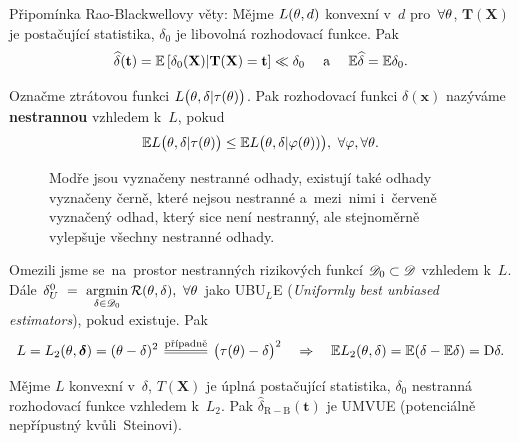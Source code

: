 \begin{remark}
	Připomínka Rao-Blackwellovy věty: Mějme $L(\theta,d)$ konvexní v~$d$ pro~$\forall\theta$, $\textbf{T}(\textbf{X})$ je postačující statistika, $\delta_0$ je libovolná rozhodovací funkce. Pak $$\widehat{\delta}(\textbf{t})=\mathbb{E}\left[ \delta_0(\textbf{X})|\textbf{T}(\textbf{X})=\textbf{t} \right]\ll \delta_0\quad\text{ a~}\quad\mathbb{E}\widehat{\delta}=\mathbb{E} \delta_0.$$
\end{remark}
\begin{define}
	Označme ztrátovou funkci $L\big(\theta,\delta|\tau(\theta)\big)$. Pak rozhodovací funkci $\delta(\textbf{x})$ nazýváme \textbf{nestrannou} vzhledem k~$L$, pokud $$ \mathbb{E} L\big(\theta,\delta|\tau(\theta)\big)\leq \mathbb{E} L\big(\theta,\delta|\varphi(\theta))\big),~\forall\varphi,\forall\theta.$$
\end{define}	\begin{figure}[h]
	\centering
	\caption{Modře jsou vyznačeny nestranné odhady, existují také odhady vyznačeny černě, které nejsou nestranné a~mezi~nimi i~červeně vyznačený odhad, který sice není nestranný, ale stejnoměrně vylepšuje všechny nestranné odhady.}
	\label{fig:3}
\end{figure}
Omezili jsme se~na~prostor nestranných rizikových funkcí $\mathscr{D}_0\subset \mathscr{D} $ vzhledem k~$L$. Dále
$ \delta_U^0~=~\mathop{\mathrm{argmin}}\limits_{\delta\in\mathscr{D} _0}\mathcal{R}(\theta,\delta),~\forall\theta$ jako UBU$_L$E (\textit{Uniformly best unbiased estimators}), pokud existuje. Pak
$$ L=L_2(\t,\boldsymbol{\delta})=(\t-\delta)^2\equal{\text{případně}}\big(\tau(\t)-\delta\big)^2\quad\Rightarrow\quad \E L_2(\t,\delta)=\E (\delta-\E \delta)=\D \delta.$$


\begin{theorem}
	Mějme $L$ konvexní v~$\delta$, $T(\textbf{X})$ je úplná postačující statistika, $\delta_0$ nestranná rozhodovací funkce vzhledem k~$L_2$. Pak $\widehat{\delta}_\mathrm{R-B}(\textbf{t})$ je UMVUE (potenciálně nepřípustný kvůli~Steinovi).
	
	
\end{theorem}

